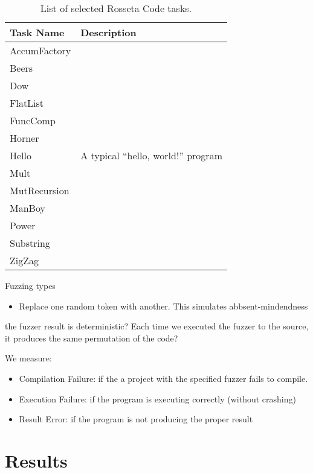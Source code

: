 \documentclass[10pt]{sigplanconf}
\begin{document}
\begin{table}
\begin{center}
\caption{List of selected Rosseta Code tasks.}
\label{tab:Tasks}
\begin{tabular}{ l p{4cm}}
 \hline
Task Name & Description\\
\hline
AccumFactory \\
Beers \\
Dow \\
FlatList \\
FuncComp \\
Horner \\
Hello & A typical ``hello, world!'' program\\
Mult \\
MutRecursion \\
ManBoy \\
Power \\
Substring \\
ZigZag \\
\hline
\end{tabular}
\end{center}
\end{table}


Fuzzing types
\begin{itemize}
\item Replace one random token with another.
This simulates abbsent-mindendness 
\end{itemize}

the fuzzer result is deterministic? Each time we executed the fuzzer to the source, it produces the same permutation of the code?

We measure:

\begin{itemize}
	\item Compilation Failure: if the a project with the specified fuzzer fails to compile.
	\item Execution Failure: if the program is executing correctly (without crashing)
	\item Result Error: if the program is not producing the proper result
\end{itemize}

\section{Results} %
\end{document}
